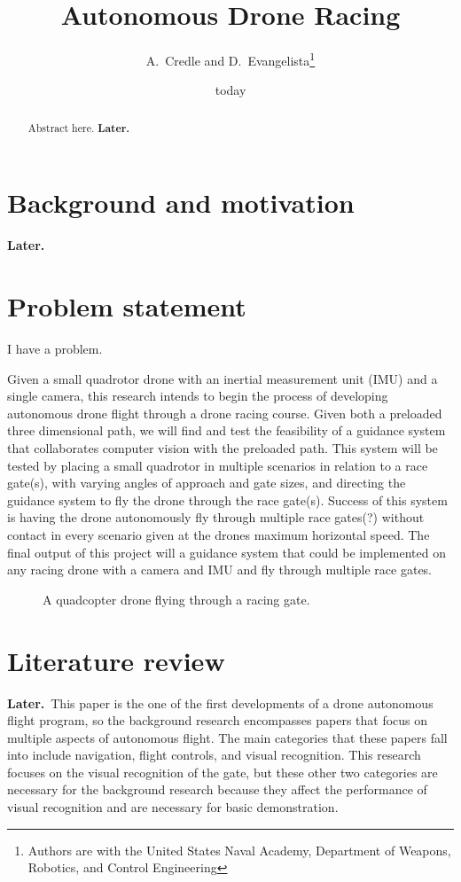 \documentclass[onecolumn,10pt]{IEEEtran}
\title{Autonomous Drone Racing}
\author{A.~Credle and D.~Evangelista\thanks{Authors are with the United States Naval Academy, Department of Weapons, Robotics, and Control Engineering}}
\date{today}
\newcommand{\myroot}{../}
\newcommand{\Later}{\textbf{Later.}}
\begin{document}
\maketitle

\begin{abstract}
Abstract here. \Later
\end{abstract}

\section{Background and motivation}
\Later

\section{Problem statement}
I have a problem. 

Given a small quadrotor drone with an inertial measurement unit (IMU) and a single camera, this research intends to begin the process of developing autonomous drone flight through a drone racing course. Given both a preloaded three dimensional path,  we will find and test the feasibility of a guidance system that collaborates computer vision with the preloaded path. This system will be tested by placing a small quadrotor in multiple scenarios in relation to a race gate(s), with varying angles of approach and gate sizes, and directing the guidance system to fly the drone through the race gate(s). Success of this system is having the drone autonomously fly through multiple race gates(?) without contact in every scenario given at the drones maximum horizontal speed. The final output of this project will a guidance system that could be implemented on any racing drone with a camera and IMU and fly through multiple race gates. 
\begin{figure}[h]
\begin{center}
\end{center}
\caption{A quadcopter drone flying through a racing gate.}
\label{fig-problem-statement-1}
\end{figure}

\section{Literature review}
\Later\ This paper is the one of the first developments of a drone autonomous flight program, so the background research encompasses papers that focus on multiple aspects of autonomous flight. The main categories that these papers fall into include navigation, flight controls, and visual recognition. This research focuses on the visual recognition of the gate, but these other two categories are necessary for the background research because they affect the performance of visual recognition and are necessary for basic demonstration. 
\end{document}
